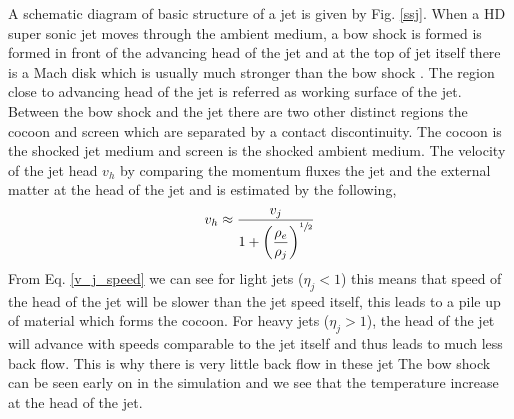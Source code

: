 \documentclass[12pt]{ociamthesis}
\newcommand{\eref}[1]{Eq. \eqref{#1}}
\newcommand{\fref}[1]{Fig. \eqref{#1}}
\begin{document}
\par A schematic diagram of basic structure of a jet is given by \fref{ssj}. When a HD super sonic jet moves through the ambient medium, a bow shock is formed is formed in front of the advancing head of the jet and at the top of jet itself there is a Mach disk which is usually much stronger than the bow shock \citep{Chakrabarti1988}. The region close to advancing head of the jet is referred as working surface of the jet. Between the bow shock and the jet there are two other distinct regions the cocoon and screen which are separated by a contact discontinuity. The cocoon is the shocked jet medium and screen is the shocked ambient medium. The velocity of the jet head $v_h$ by comparing the momentum fluxes the jet and the external matter at the head of the jet and is estimated by the following,
\begin{equation}\label{v_j_speed}
v_h \approx \dfrac{v_j}{1+ \left( \dfrac{\rho_e}{\rho_j} \right)^{\sfrac{1}{2}}} 
\end{equation}
From \eref{v_j_speed} we can see for light jets ($\eta_j<1$) this means that speed of the head of the jet will be slower than the jet speed itself, this leads to a pile up of material which forms the cocoon. For heavy jets ($\eta_j>1$), the head of the jet will advance with speeds comparable to the jet itself and thus leads to much less back flow. This is why there is very little back flow in these jet The bow shock can be seen early on in the simulation and we see that the temperature increase at the head of the jet.
\end{document}
